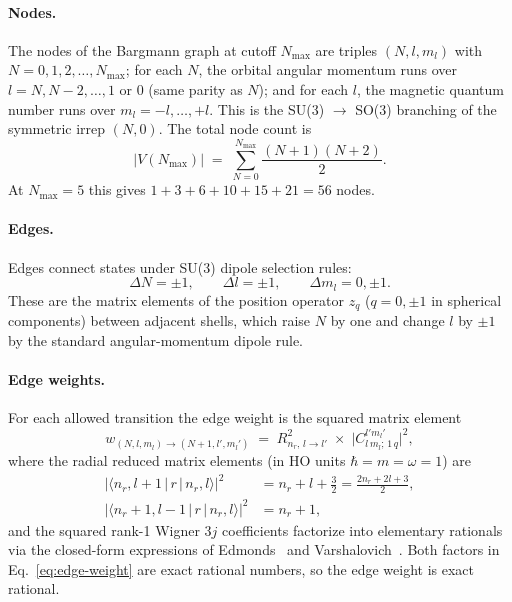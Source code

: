 \documentclass[twocolumn,pra,amsmath,amssymb,superscriptaddress]{revtex4-2}
\begin{document}
\paragraph{Nodes.}
The nodes of the Bargmann graph at cutoff $N_{\max}$ are triples
$(N, l, m_l)$ with $N = 0, 1, 2, \ldots, N_{\max}$; for each $N$,
the orbital angular momentum runs over $l = N, N - 2, \ldots, 1$
or $0$ (same parity as $N$); and for each $l$, the magnetic
quantum number runs over $m_l = -l, \ldots, +l$.  This is the
SU(3) $\to$ SO(3) branching of the symmetric irrep $(N, 0)$.  The
total node count is
\begin{equation}
  |V(N_{\max})|
  \;=\;
  \sum_{N = 0}^{N_{\max}}
  \frac{(N+1)(N+2)}{2}.
  \label{eq:node-count}
\end{equation}
At $N_{\max} = 5$ this gives $1 + 3 + 6 + 10 + 15 + 21 = 56$
nodes.

\paragraph{Edges.}
Edges connect states under SU(3) dipole selection rules:
\begin{equation}
  \Delta N = \pm 1,
  \qquad
  \Delta l = \pm 1,
  \qquad
  \Delta m_l = 0, \pm 1.
\end{equation}
These are the matrix elements of the position operator $z_q$
($q = 0, \pm 1$ in spherical components) between adjacent shells,
which raise $N$ by one and change $l$ by $\pm 1$ by the standard
angular-momentum dipole rule.

\paragraph{Edge weights.}
For each allowed transition the edge weight is the squared matrix
element
\begin{equation}
  w_{(N,l,m_l) \to (N+1,l',m_l')}
  \;=\;
  R^{2}_{n_r,\, l \to l'}
  \;\times\;
  \bigl|
  C^{l' m_l'}_{l\, m_l;\, 1\, q}
  \bigr|^2,
  \label{eq:edge-weight}
\end{equation}
where the radial reduced matrix elements (in HO units $\hbar = m =
\omega = 1$) are
\begin{align}
  \bigl|\langle n_r, l + 1 \,|\, r \,|\, n_r, l \rangle\bigr|^2
  &= n_r + l + \tfrac{3}{2}
  = \tfrac{2 n_r + 2 l + 3}{2},
  \\[2pt]
  \bigl|\langle n_r + 1, l - 1 \,|\, r \,|\, n_r, l \rangle\bigr|^2
  &= n_r + 1,
\end{align}
and the squared rank-1 Wigner $3j$ coefficients factorize into
elementary rationals via the closed-form expressions of
Edmonds~\cite{edmonds} and Varshalovich~\cite{varshalovich}.  Both
factors in Eq.~\eqref{eq:edge-weight} are exact rational numbers,
so the edge weight is exact rational.
\end{document}
